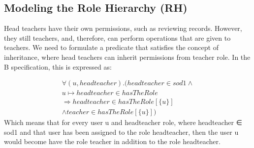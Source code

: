 \subsection{Modeling the Role Hierarchy (RH)}
     Head teachers have their own permissions, such as reviewing records.  However, they still teachers, and, therefore, can perform operations that are given to teachers.  We need to formulate a predicate that satisfies the concept of inheritance, where head teachers can inherit permissions from teacher role.  In the B specification, this is expressed as:

\begin{align*}
\forall (u, headteacher) . (headteacher  \in sod1  \wedge  \\ u \mapsto headteacher \in hasTheRole
\\ \Rightarrow headteacher  \in hasTheRole[\{u\}]  \\ \wedge  teacher  \in hasTheRole[\{u\}] )
\end{align*}
    Which means that for every user u and headteacher role, where headteacher ∈ sod1 and that user has been assigned to the role headteacher, then the user u would become have the role teacher in addition to the role headteacher.
